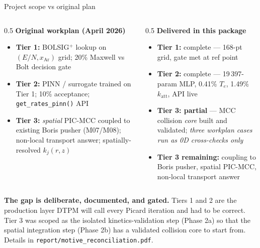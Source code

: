 \documentclass[10pt,aspectratio=169]{beamer}
\begin{document}
\begin{frame}{Project scope vs original plan}
  \footnotesize
  \begin{columns}[T]
    \begin{column}{0.5\textwidth}
      \textbf{Original workplan (April 2026)}
      \begin{itemize}\footnotesize
        \item[\checkmark] \textbf{Tier 1:} BOLSIG$^+$ lookup on
              $(E/N, x_{\mathrm{Ar}})$ grid; 20\% Maxwell
              vs Bolt decision gate
        \item[\checkmark] \textbf{Tier 2:} PINN / surrogate
              trained on Tier 1; 10\% acceptance;
              \texttt{get\_rates\_pinn()} API
        \item \textbf{Tier 3:} \emph{spatial} PIC-MCC
              coupled to existing Boris pusher (M07/M08);
              non-local transport answer;
              spatially-resolved $k_j(r,z)$
      \end{itemize}
    \end{column}
    \begin{column}{0.5\textwidth}
      \textbf{Delivered in this package}
      \begin{itemize}\footnotesize
        \item[\checkmark] \textbf{Tier 1:} complete --- 168-pt grid,
              gate met at ref point
        \item[\checkmark] \textbf{Tier 2:} complete ---
              19\,397-param MLP, 0.41\% $T_e$, 1.49\%
              $k_{\mathrm{att}}$, API live
        \item[$\sim$] \textbf{Tier 3: partial} ---
              MCC collision \emph{core} built and
              validated; \emph{three workplan cases run
              as 0D cross-checks only}
        \item[$\times$] \textbf{Tier 3 remaining:}
              coupling to Boris pusher, spatial PIC-MCC,
              non-local transport answer
      \end{itemize}
    \end{column}
  \end{columns}

  \vspace{0.4em}
  \textcolor{red!70!black}{\textbf{The gap is deliberate, documented,
  and gated.}} Tiers 1 and 2 are the production layer DTPM will call
  every Picard iteration and had to be correct. Tier 3 was scoped as
  the isolated kinetics-validation step (Phase 2a) so that the
  spatial integration step (Phase 2b) has a validated collision core
  to start from. Details in
  \texttt{report/motive\_reconciliation.pdf}.
\end{frame}
\end{document}
